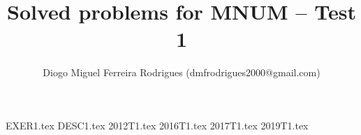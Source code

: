 \documentclass{mnumstyle}
\title{Solved problems for MNUM -- Test 1}
\author{Diogo Miguel Ferreira Rodrigues (dmfrodrigues2000@gmail.com)}
\date{}
\begin{document}
\begingroup
\maketitle
	\let\clearpage\relax
	\tableofcontents
\endgroup
{EXER1.tex}
{DESC1.tex}
{2012T1.tex}
{2016T1.tex}
{2017T1.tex}
{2019T1.tex}
\end{document}
